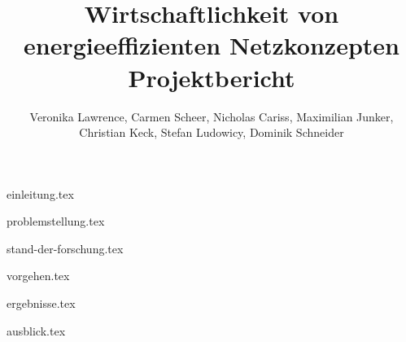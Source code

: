 \documentclass[12pt,titlepage]{article}
\title{\huge{Wirtschaftlichkeit von energieeffizienten Netzkonzepten} \\ \large{Projektbericht}}
\author{Veronika Lawrence, Carmen Scheer, Nicholas Cariss, Maximilian Junker,\\ Christian Keck, Stefan Ludowicy, Dominik Schneider}
\begin{document}
\maketitle
\newpage
\tableofcontents{}
\newpage
\listoffigures
\listoftables
\newpage


{einleitung.tex}

{problemstellung.tex}

{stand-der-forschung.tex}

{vorgehen.tex}

{ergebnisse.tex}

{ausblick.tex}

\newpage
\printbibliography[heading=bibintoc]
\end{document}
